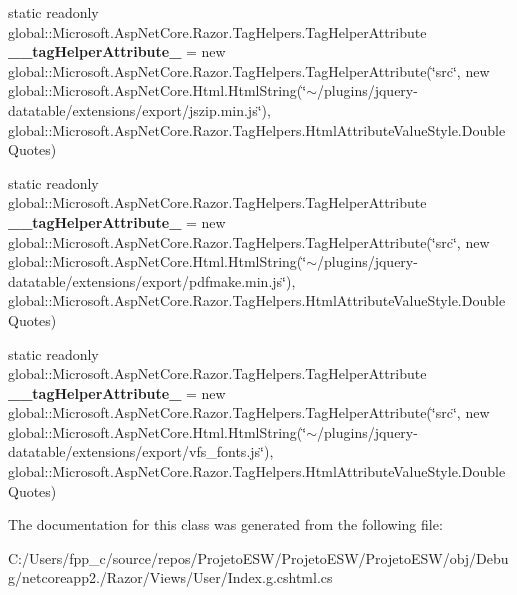 \begin{DoxyCompactItemize}
\item 
\mbox{\label{class_asp_net_core_1_1_views___user___index_ac1fc597db8f44bdc37dcfc8d51f7b12e}} 
static readonly global\+::\+Microsoft.\+Asp\+Net\+Core.\+Razor.\+Tag\+Helpers.\+Tag\+Helper\+Attribute {\bfseries \+\_\+\+\_\+tag\+Helper\+Attribute\+\_} = new global\+::\+Microsoft.\+Asp\+Net\+Core.\+Razor.\+Tag\+Helpers.\+Tag\+Helper\+Attribute(\char`\"{}src\char`\"{}, new global\+::\+Microsoft.\+Asp\+Net\+Core.\+Html.\+Html\+String(\char`\"{}$\sim$/plugins/jquery-\/datatable/extensions/export/jszip.\+min.\+js\char`\"{}), global\+::\+Microsoft.\+Asp\+Net\+Core.\+Razor.\+Tag\+Helpers.\+Html\+Attribute\+Value\+Style.\+Double\+Quotes)
\item 
\mbox{\label{class_asp_net_core_1_1_views___user___index_ad941992acd2e8b0d999611bae508e29e}} 
static readonly global\+::\+Microsoft.\+Asp\+Net\+Core.\+Razor.\+Tag\+Helpers.\+Tag\+Helper\+Attribute {\bfseries \+\_\+\+\_\+tag\+Helper\+Attribute\+\_} = new global\+::\+Microsoft.\+Asp\+Net\+Core.\+Razor.\+Tag\+Helpers.\+Tag\+Helper\+Attribute(\char`\"{}src\char`\"{}, new global\+::\+Microsoft.\+Asp\+Net\+Core.\+Html.\+Html\+String(\char`\"{}$\sim$/plugins/jquery-\/datatable/extensions/export/pdfmake.\+min.\+js\char`\"{}), global\+::\+Microsoft.\+Asp\+Net\+Core.\+Razor.\+Tag\+Helpers.\+Html\+Attribute\+Value\+Style.\+Double\+Quotes)
\item 
\mbox{\label{class_asp_net_core_1_1_views___user___index_a0d7db54a7cd86476ab238e1f49d9b182}} 
static readonly global\+::\+Microsoft.\+Asp\+Net\+Core.\+Razor.\+Tag\+Helpers.\+Tag\+Helper\+Attribute {\bfseries \+\_\+\+\_\+tag\+Helper\+Attribute\+\_} = new global\+::\+Microsoft.\+Asp\+Net\+Core.\+Razor.\+Tag\+Helpers.\+Tag\+Helper\+Attribute(\char`\"{}src\char`\"{}, new global\+::\+Microsoft.\+Asp\+Net\+Core.\+Html.\+Html\+String(\char`\"{}$\sim$/plugins/jquery-\/datatable/extensions/export/vfs\+\_\+fonts.\+js\char`\"{}), global\+::\+Microsoft.\+Asp\+Net\+Core.\+Razor.\+Tag\+Helpers.\+Html\+Attribute\+Value\+Style.\+Double\+Quotes)
\end{DoxyCompactItemize}


The documentation for this class was generated from the following file\+:\begin{DoxyCompactItemize}
\item 
C\+:/\+Users/fpp\+\_\+c/source/repos/\+Projeto\+E\+S\+W/\+Projeto\+E\+S\+W/\+Projeto\+E\+S\+W/obj/\+Debug/netcoreapp2./\+Razor/\+Views/\+User/Index.\+g.\+cshtml.\+cs\end{DoxyCompactItemize}
